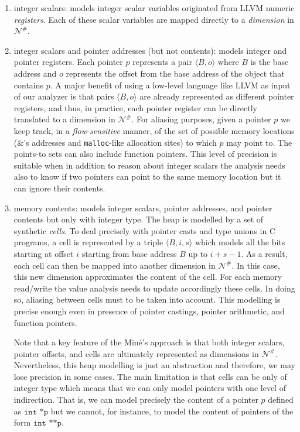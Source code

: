 \documentclass[a4]{article}
\begin{document}
\begin{enumerate}

\item integer scalars: models integer scalar variables originated
  from LLVM numeric \emph{registers}. Each of these scalar variables
  are mapped directly to a \emph{dimension} in $\mathcal{N}^{\#}$.

\item integer scalars and pointer addresses (but not contents): models
  integer and pointer registers. Each pointer $p$ represents a pair
  $\langle B, o \rangle$ where $B$ is the base address and $o$
  represents the offset from the base address of the object that
  contains $p$. A major benefit of using a low-level language like
  LLVM as input of our analyzer is that pairs $\langle B, o \rangle$
  are already represented as different pointer registers, and thus, in
  practice, each pointer register can be directly translated to a
  dimension in $\mathcal{N}^{\#}$.  For aliasing purposes, given a
  pointer $p$ we keep track, in a \emph{flow-sensitive} manner, of the
  set of possible memory locations ($\mathtt{\&}$'s addresses and
  \texttt{malloc}-like allocation sites) to which $p$ may point
  to. The points-to sets can also include function pointers. This
  level of precision is suitable when in addition to reason about
  integer scalars the analysis needs also to know if two pointers can
  point to the same memory location but it can ignore their contents.
  
\item memory contents: models integer scalars, pointer addresses, and
  pointer contents but only with integer type. The heap is modelled by
  a set of synthetic \emph{cells}. To deal precisely with pointer
  casts and type unions in C programs, a cell is represented by a
  triple $\langle B, i, s\rangle$ which models all the bits starting
  at offset $i$ starting from base address $B$ up to $i + s - 1$. As a
  result, each cell can then be mapped into another dimension in
  $\mathcal{N}^{\#}$. In this case, this new dimension approximates
  the content of the cell. For each memory read/write the value
  analysis needs to update accordingly these cells. In doing so,
  aliasing between cells must to be taken into account. This modelling
  is precise enough even in presence of pointer castings, pointer
  arithmetic, and function pointers.

  Note that a key feature of the Min\'{e}'s approach is that both
  integer scalars, pointer offsets, and cells are ultimately
  represented as dimensions in $\mathcal{N}^{\#}$. Nevertheless, this
  heap modelling is just an abstraction and therefore, we may lose
  precision in some cases. The main limitation is that cells can be
  only of integer type which means that we can only model pointers
  with one level of indirection. That is, we can model precisely the
  content of a pointer $p$ defined as $\texttt{int *p}$ but we cannot,
  for instance, to model the content of pointers of the form
  $\texttt{int **p}$.

\end{enumerate}
\end{document}
